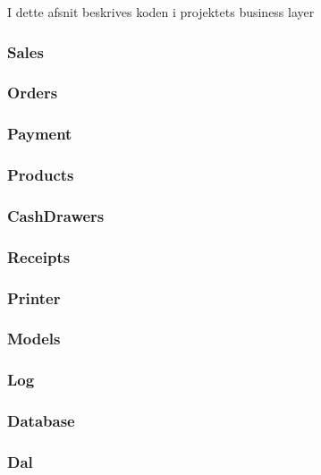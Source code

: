 I dette afsnit beskrives koden i projektets business layer
\subsubsection{Sales}
%

\subsubsection{Orders}
%

\subsubsection{Payment}
%

\subsubsection{Products}
%

\subsubsection{CashDrawers}
%

\subsubsection{Receipts}
%

\subsubsection{Printer}
%

\subsubsection{Models}
%

\subsubsection{Log}
%

\subsubsection{Database}
%

\subsubsection{Dal}
%

